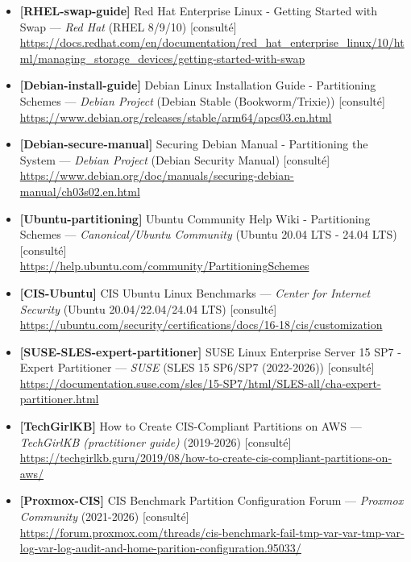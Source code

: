 \documentclass[10pt,a4paper]{article}
\begin{document}
\begin{itemize}[leftmargin=1.6em]
\item \textbf{[RHEL-swap-guide]} Red Hat Enterprise Linux - Getting Started with Swap --- \textit{Red Hat} (RHEL 8/9/10) \textcolor{cOk}{[consult\'e]}\\ \url{https://docs.redhat.com/en/documentation/red_hat_enterprise_linux/10/html/managing_storage_devices/getting-started-with-swap}
\item \textbf{[Debian-install-guide]} Debian Linux Installation Guide - Partitioning Schemes --- \textit{Debian Project} (Debian Stable (Bookworm/Trixie)) \textcolor{cOk}{[consult\'e]}\\ \url{https://www.debian.org/releases/stable/arm64/apcs03.en.html}
\item \textbf{[Debian-secure-manual]} Securing Debian Manual - Partitioning the System --- \textit{Debian Project} (Debian Security Manual) \textcolor{cOk}{[consult\'e]}\\ \url{https://www.debian.org/doc/manuals/securing-debian-manual/ch03s02.en.html}
\item \textbf{[Ubuntu-partitioning]} Ubuntu Community Help Wiki - Partitioning Schemes --- \textit{Canonical/Ubuntu Community} (Ubuntu 20.04 LTS - 24.04 LTS) \textcolor{cOk}{[consult\'e]}\\ \url{https://help.ubuntu.com/community/PartitioningSchemes}
\item \textbf{[CIS-Ubuntu]} CIS Ubuntu Linux Benchmarks --- \textit{Center for Internet Security} (Ubuntu 20.04/22.04/24.04 LTS) \textcolor{cOk}{[consult\'e]}\\ \url{https://ubuntu.com/security/certifications/docs/16-18/cis/customization}
\item \textbf{[SUSE-SLES-expert-partitioner]} SUSE Linux Enterprise Server 15 SP7 - Expert Partitioner --- \textit{SUSE} (SLES 15 SP6/SP7 (2022-2026)) \textcolor{cOk}{[consult\'e]}\\ \url{https://documentation.suse.com/sles/15-SP7/html/SLES-all/cha-expert-partitioner.html}
\item \textbf{[TechGirlKB]} How to Create CIS-Compliant Partitions on AWS --- \textit{TechGirlKB (practitioner guide)} (2019-2026) \textcolor{cOk}{[consult\'e]}\\ \url{https://techgirlkb.guru/2019/08/how-to-create-cis-compliant-partitions-on-aws/}
\item \textbf{[Proxmox-CIS]} CIS Benchmark Partition Configuration Forum --- \textit{Proxmox Community} (2021-2026) \textcolor{cOk}{[consult\'e]}\\ \url{https://forum.proxmox.com/threads/cis-benchmark-fail-tmp-var-var-tmp-var-log-var-log-audit-and-home-parition-configuration.95033/}
\end{itemize}
\end{document}
